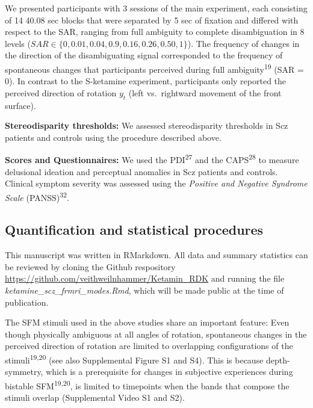 \documentclass[
]{article}
\begin{document}
We presented participants with 3 sessions of the main experiment, each
consisting of 14 40.08 sec blocks that were separated by 5 sec of
fixation and differed with respect to the SAR, ranging from full
ambiguity to complete disambiguation in 8 levels
(\(SAR \in \{ 0, 0.01, 0.04, 0.9, 0.16, 0.26, 0.50, 1 \}\)). The
frequency of changes in the direction of the disambiguating signal
corresponded to the frequency of spontaneous changes that participants
perceived during full ambiguity\textsuperscript{19} (SAR = 0). In
contrast to the S-ketamine experiment, participants only reported the
perceived direction of rotation \(y_t\) (left vs.~rightward movement of
the front surface).

\textbf{Stereodisparity thresholds:} We assessed stereodisparity
thresholds in Scz patients and controls using the procedure described
above.

\textbf{Scores and Questionnaires:} We used the PDI\textsuperscript{27}
and the CAPS\textsuperscript{28} to measure delusional ideation and
perceptual anomalies in Scz patients and controls. Clinical symptom
severity was assessed using the \emph{Positive and Negative Syndrome
Scale} (PANSS)\textsuperscript{32}.

\hypertarget{quantification-and-statistical-procedures}{%
\subsection{Quantification and statistical
procedures}\label{quantification-and-statistical-procedures}}

This manuscript was written in RMarkdown. All data and summary
statistics can be reviewed by cloning the Github respository
\url{https://github.com/veithweilnhammer/Ketamin_RDK} and running the
file \emph{ketamine\_scz\_frmri\_modes.Rmd}, which will be made public
at the time of publication.

The SFM stimuli used in the above studies share an important feature:
Even though physically ambiguous at all angles of rotation, spontaneous
changes in the perceived direction of rotation are limited to
overlapping configurations of the stimuli\textsuperscript{19,20} (see
also Supplemental Figure S1 and S4). This is because depth-symmetry,
which is a prerequisite for changes in subjective experiences during
bistable SFM\textsuperscript{19,20}, is limited to timepoints when the
bands that compose the stimuli overlap (Supplemental Video S1 and S2).
\end{document}
